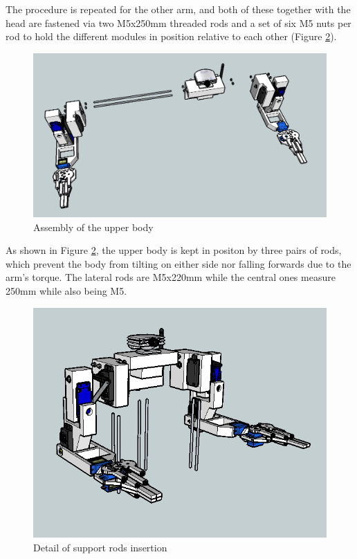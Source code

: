 \newpage
The procedure is repeated for the other arm, and both of these together with the head are fastened via two M5x250mm threaded rods and a set of six M5 nuts per rod to hold the different modules in position relative to each other (Figure \ref{ass22}).\\

	\begin{figure}[H]
			\centering
			\includegraphics[scale=0.4]{images/Assembly/20.png}
			\caption{Assembly of the upper body }
			\label{ass22}
	\end{figure}
	\bigskip


As shown in Figure \ref{ass22}, the upper body is kept in positon by three pairs of rods, which prevent the  body from tilting on either side nor falling forwards due to the arm's torque. The lateral rods are M5x220mm while the central ones measure 250mm while also being M5.\\

	\begin{figure}[H]
			\centering
			\includegraphics[scale=0.45]{images/Assembly/22.png}
			\caption{Detail of support rods insertion }
			\label{ass22}
	\end{figure}
	\bigskip


